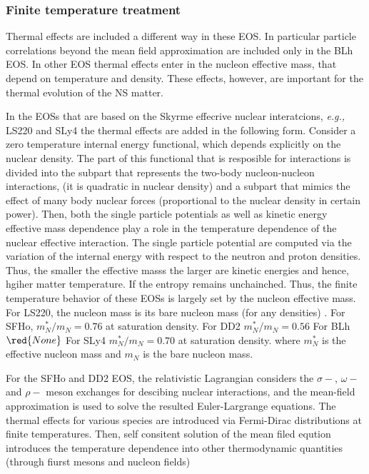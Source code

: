 \subsubsection{Finite temperature treatment}


Thermal effects are included a different way in these EOS. 
In particular particle correlations beyond the mean field approximation are included only in the BLh EOS.
In other EOS thermal effects enter in the nucleon effective mass, that depend on temperature and density.
These effects, however, are important for the thermal evolution of the NS matter.

In the EOSs that are based on the Skyrme effecrive nuclear interatcions, \textit{e.g.,} LS220 and SLy4
the thermal effects are added in the following form. 
Consider a zero temperature internal energy functional, which depends explicitly on the nuclear density.
The part of this functional that is resposible for interactions is divided into the 
subpart that represents the two-body nucleon-nucleon interactions, (it is quadratic in nuclear density) and a 
subpart that mimics the effect of many body nuclear forces (proportional to the nuclear density in certain power).
Then, both the single particle potentials as well as kinetic energy effective mass dependence play a role
in the temperature dependence of the nuclear effective interaction.
The single particle potential are computed via the variation of the internal energy with respect to the 
neutron and proton densities.
Thus, the smaller the effective masss the larger are kinetic energies and hence, hgiher matter temperature. 
If the entropy remains unchainched.
Thus, the finite temperature behavior of these EOSs is largely set by the nucleon effective mass.
For LS220, the nucleon mass is its bare nucleon mass (for any densities) .
For SFHo, $m_N ^* / m_N = 0.76$ at saturation density. 
For DD2 $m_N^*/m_N = 0.56$ 
For BLh $\red{None}$ 
For SLy4 $m_N^*/m_N=0.70$ at saturation density. 
where $m_{N}^*$ is the effective nucleon mass and $m_N$ is the bare nucleon mass.

For the SFHo and DD2 EOS, the relativistic Lagrangian considers the $\sigma-$, $\omega-$ and $\rho-$
meson exchanges for descibing nuclear interactions, and the mean-field approximation is used
to solve the resulted Euler-Largrange equations. 
The thermal effects for various species are introduced via Fermi-Dirac distributions at finite temperatures.
Then, self consitent solution of the mean filed eqution introduces the temperature dependence into other 
thermodynamic quantities (through fiurst mesons and nucleon fields)

